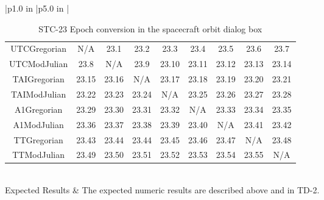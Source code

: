 \begin{table}[htbp!]
\begin{tabular}{|p{1.0 in} |p{5.0 in} |}
\begin{centering}
\begin{tabular}{|c|c|c|c|c|c|c|c|c|}
             \rotatebox{90}{ TTGregorian  }  &
             \rotatebox{90}{ TTModJulian  }  \\ \hline
             UTCGregorian & N/A & 23.1 & 23.2 & 23.3 & 23.4 & 23.5 & 23.6 & 23.7 \\ \hline
             UTCModJulian & 23.8 & N/A & 23.9 & 23.10 & 23.11 & 23.12 & 23.13 & 23.14\\ \hline
             TAIGregorian & 23.15 & 23.16 & N/A & 23.17 & 23.18 & 23.19 & 23.20 & 23.21\\ \hline
             TAIModJulian & 23.22 & 23.23 & 23.24 & N/A & 23.25 & 23.26 & 23.27 & 23.28\\ \hline
             A1Gregorian & 23.29 & 23.30 & 23.31 & 23.32 & N/A & 23.33 & 23.34 & 23.35\\ \hline
             A1ModJulian & 23.36 & 23.37 & 23.38 & 23.39 & 23.40 &  N/A & 23.41 & 23.42\\ \hline
             TTGregorian & 23.43 & 23.44 & 23.44 & 23.45 & 23.46 & 23.47 & N/A & 23.48\\ \hline
             TTModJulian & 23.49 & 23.50 & 23.51 & 23.52 & 23.53 & 23.54 & 23.55 & N/A\\ \hline
          \end{tabular}
          \end{centering} \vspace{0.1 in}\\
         \hline
         Expected Results & The expected numeric results are described above and in TD-2.\\
      \hline
\end{tabular}
   \label{Table:STC-23}
   \caption{STC-23 Epoch conversion in the spacecraft orbit dialog box}
\end{table} 